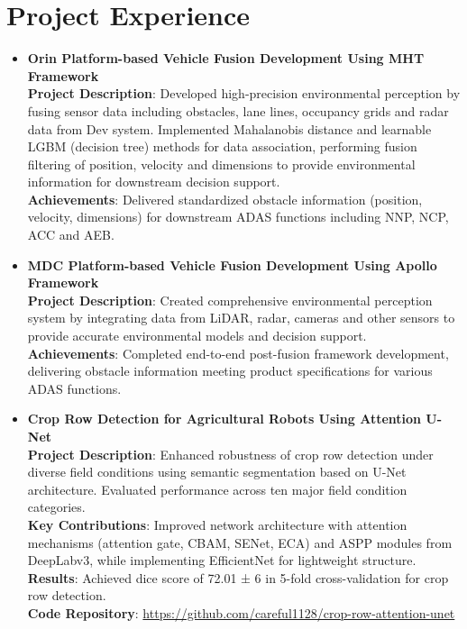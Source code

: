 \documentclass[11pt,a4paper]{article}
\begin{document}
\section*{Project Experience}
\begin{itemize}[leftmargin=*]
    \item \textbf{Orin Platform-based Vehicle Fusion Development Using MHT Framework} \\
    \textbf{Project Description}: Developed high-precision environmental perception by fusing sensor data including obstacles, lane lines, occupancy grids and radar data from Dev system. Implemented Mahalanobis distance and learnable LGBM (decision tree) methods for data association, performing fusion filtering of position, velocity and dimensions to provide environmental information for downstream decision support. \\
    \textbf{Achievements}: Delivered standardized obstacle information (position, velocity, dimensions) for downstream ADAS functions including NNP, NCP, ACC and AEB.
    
    \item \textbf{MDC Platform-based Vehicle Fusion Development Using Apollo Framework} \\
    \textbf{Project Description}: Created comprehensive environmental perception system by integrating data from LiDAR, radar, cameras and other sensors to provide accurate environmental models and decision support. \\
    \textbf{Achievements}: Completed end-to-end post-fusion framework development, delivering obstacle information meeting product specifications for various ADAS functions.
    
    \item \textbf{Crop Row Detection for Agricultural Robots Using Attention U-Net} \\
    \textbf{Project Description}: Enhanced robustness of crop row detection under diverse field conditions using semantic segmentation based on U-Net architecture. Evaluated performance across ten major field condition categories. \\
    \textbf{Key Contributions}: Improved network architecture with attention mechanisms (attention gate, CBAM, SENet, ECA) and ASPP modules from DeepLabv3, while implementing EfficientNet for lightweight structure. \\
    \textbf{Results}: Achieved dice score of 72.01 ± 6 in 5-fold cross-validation for crop row detection. \\
    \textbf{Code Repository}: \url{https://github.com/careful1128/crop-row-attention-unet}
    

\end{itemize}
\end{document}
